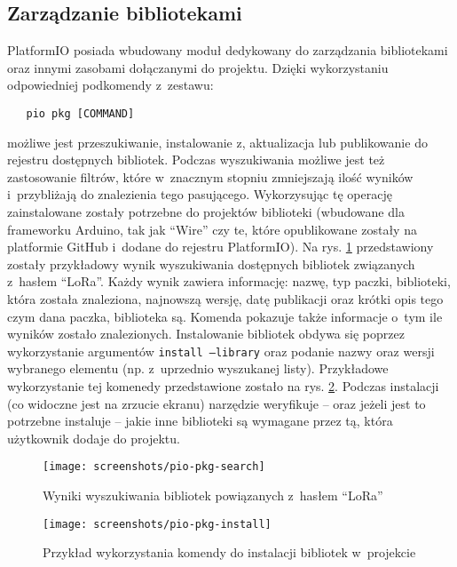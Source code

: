 \subsection{Zarządzanie bibliotekami\label{sect:pio-pkg}} PlatformIO posiada wbudowany moduł dedykowany do zarządzania
bibliotekami oraz innymi zasobami dołączanymi do projektu. Dzięki wykorzystaniu odpowiedniej podkomendy z~zestawu:
\begin{verbatim}
   pio pkg [COMMAND]
\end{verbatim}
możliwe jest przeszukiwanie, instalowanie z, aktualizacja lub publikowanie do rejestru dostępnych bibliotek. Podczas
wyszukiwania możliwe jest też zastosowanie filtrów, które w~znacznym stopniu zmniejszają ilość wyników i~przybliżają do
znalezienia tego pasującego. Wykorzysując tę operację zainstalowane zostały potrzebne do projektów biblioteki (wbudowane
dla frameworku Arduino, tak jak \enquote{Wire} czy te, które opublikowane zostały na platformie GitHub i~dodane do
rejestru PlatformIO). Na rys. \ref{img:pio-pkg-search} przedstawiony zostały przykładowy wynik wyszukiwania dostępnych
bibliotek związanych z~hasłem \enquote{LoRa}. Każdy wynik zawiera informację: nazwę, typ paczki, biblioteki, która
została znaleziona, najnowszą wersję, datę publikacji oraz krótki opis tego czym dana paczka, biblioteka są. Komenda
pokazuje także informacje o~tym ile wyników zostało znalezionych. Instalowanie bibliotek obdywa się poprzez
wykorzystanie argumentów \texttt{install --library} oraz podanie nazwy oraz wersji wybranego elementu (np. z~uprzednio
wyszukanej listy). Przykładowe wykorzystanie tej komenedy przedstawione zostało na rys. \ref{img:pio-pkg-install}.
Podczas instalacji (co widoczne jest na zrzucie ekranu) narzędzie weryfikuje -- oraz jeżeli jest to potrzebne instaluje
-- jakie inne biblioteki są wymagane przez tą, która użytkownik dodaje do projektu.

\begin{figure}[!htbp]
    \centering
    \texttt{[image: screenshots/pio-pkg-search]}
    \caption{\label{img:pio-pkg-search}Wyniki wyszukiwania bibliotek powiązanych z~hasłem \enquote{LoRa}}
\end{figure}

\begin{figure}[!htbp]
    \centering
    \texttt{[image: screenshots/pio-pkg-install]}
    \caption{\label{img:pio-pkg-install}Przykład wykorzystania komendy do instalacji bibliotek w~projekcie}
\end{figure}